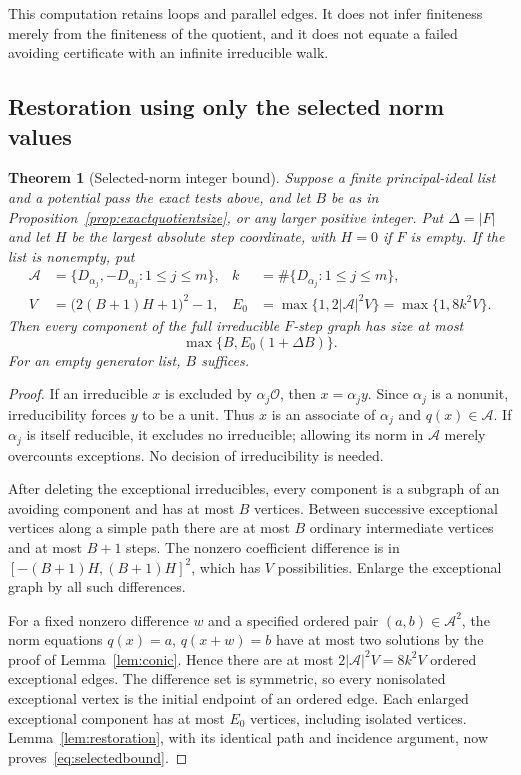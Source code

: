 \documentclass[11pt]{article}
\numberwithin{equation}{section}
\newtheorem{theorem}{Theorem}[section]
\theoremstyle{definition}\newtheorem{definition}[theorem]{Definition}
\theoremstyle{remark}\newtheorem{remark}[theorem]{Remark}
\newcommand{\OO}{\mathcal O}\newcommand{\PP}{\mathcal P}
\newcommand{\abs}[1]{\lvert #1\rvert}
\begin{document}
This computation retains loops and parallel edges. It does not infer finiteness merely from the finiteness of the quotient, and it does not equate a failed avoiding certificate with an infinite irreducible walk.

\subsection{Restoration using only the selected norm values}

\begin{theorem}[Selected-norm integer bound]\label{thm:selectednorm}
Suppose a finite principal-ideal list and a potential pass the exact tests above, and let $B$ be as in Proposition~\ref{prop:exactquotientsize}, or any larger positive integer. Put $\Delta=\abs F$ and let $H$ be the largest absolute step coordinate, with $H=0$ if $F$ is empty. If the list is nonempty, put
\begin{align*}
 \mathcal A&=\{D_{\alpha_j},-D_{\alpha_j}:1\le j\le m\},
 &k&=\#\{D_{\alpha_j}:1\le j\le m\},\\
 V&=\bigl(2(B+1)H+1\bigr)^2-1,
 &E_0&=\max\{1,2\abs{\mathcal A}^2V\}=\max\{1,8k^2V\}.
\end{align*}
Then every component of the full irreducible $F$-step graph has size at most
\begin{equation}\label{eq:selectedbound}
 \max\{B,E_0(1+\Delta B)\}.
\end{equation}
For an empty generator list, $B$ suffices.
\end{theorem}
\begin{proof}
If an irreducible $x$ is excluded by $\alpha_j\OO$, then $x=\alpha_j y$. Since $\alpha_j$ is a nonunit, irreducibility forces $y$ to be a unit. Thus $x$ is an associate of $\alpha_j$ and $q(x)\in\mathcal A$. If $\alpha_j$ is itself reducible, it excludes no irreducible; allowing its norm in $\mathcal A$ merely overcounts exceptions. No decision of irreducibility is needed.

After deleting the exceptional irreducibles, every component is a subgraph of an avoiding component and has at most $B$ vertices. Between successive exceptional vertices along a simple path there are at most $B$ ordinary intermediate vertices and at most $B+1$ steps. The nonzero coefficient difference is in $[-(B+1)H,(B+1)H]^2$, which has $V$ possibilities. Enlarge the exceptional graph by all such differences.

For a fixed nonzero difference $w$ and a specified ordered pair $(a,b)\in\mathcal A^2$, the norm equations $q(x)=a$, $q(x+w)=b$ have at most two solutions by the proof of Lemma~\ref{lem:conic}. Hence there are at most $2\abs{\mathcal A}^2V=8k^2V$ ordered exceptional edges. The difference set is symmetric, so every nonisolated exceptional vertex is the initial endpoint of an ordered edge. Each enlarged exceptional component has at most $E_0$ vertices, including isolated vertices. Lemma~\ref{lem:restoration}, with its identical path and incidence argument, now proves~\eqref{eq:selectedbound}.
\end{proof}
\end{document}
